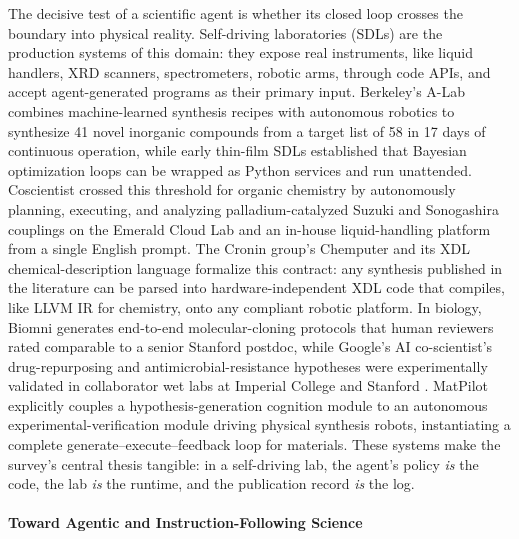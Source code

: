 The decisive test of a scientific agent is whether its closed loop crosses the boundary into physical reality. Self-driving laboratories (SDLs) are the production systems of this domain: they expose real instruments, like liquid handlers, XRD scanners, spectrometers, robotic arms, through code APIs, and accept agent-generated programs as their primary input. Berkeley's A-Lab \citep{szymanski2023autonomous} combines machine-learned synthesis recipes with autonomous robotics to synthesize 41 novel inorganic compounds from a target list of 58 in 17 days of continuous operation, while early thin-film SDLs \citep{macleod2020selfdrivinglaboratoryaccelerateddiscovery} established that Bayesian optimization loops can be wrapped as Python services and run unattended. Coscientist \citep{boiko2023autonomous} crossed this threshold for organic chemistry by autonomously planning, executing, and analyzing palladium-catalyzed Suzuki and Sonogashira couplings on the Emerald Cloud Lab and an in-house liquid-handling platform from a single English prompt. The Cronin group's Chemputer and its XDL chemical-description language \citep{mehr2020universal} formalize this contract: any synthesis published in the literature can be parsed into hardware-independent XDL code that compiles, like LLVM IR for chemistry, onto any compliant robotic platform. In biology, Biomni \citep{huang2025biomni} generates end-to-end molecular-cloning protocols that human reviewers rated comparable to a senior Stanford postdoc, while Google's AI co-scientist's drug-repurposing and antimicrobial-resistance hypotheses were experimentally validated in collaborator wet labs at Imperial College and Stanford \citep{gottweis2025aicoscientist}. MatPilot \citep{ni2024matpilotllmenabledaimaterials} explicitly couples a hypothesis-generation cognition module to an autonomous experimental-verification module driving physical synthesis robots, instantiating a complete generate–execute–feedback loop for materials. These systems make the survey's central thesis tangible: in a self-driving lab, the agent's policy \textit{is} the code, the lab \textit{is} the runtime, and the publication record \textit{is} the log.

\paragraph{Toward Agentic and Instruction-Following Science}

